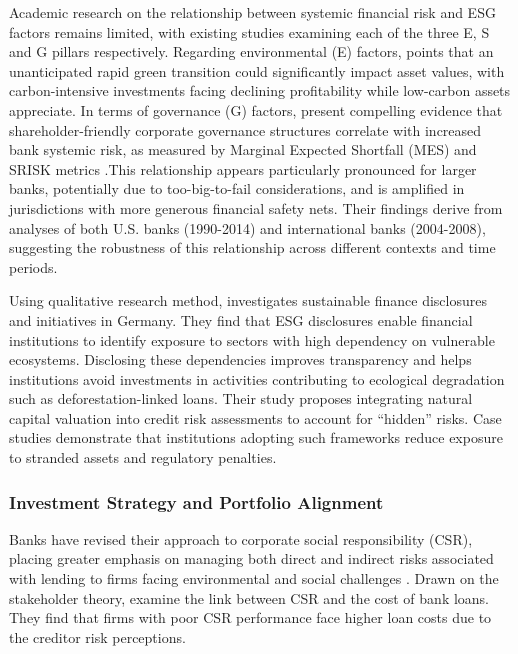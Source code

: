 \documentclass[
  authoryear]{elsarticle}
\begin{document}
Academic research on the relationship between systemic financial risk
and ESG factors remains limited, with existing studies examining each of
the three E, S and G pillars respectively. Regarding environmental (E)
factors, \citet{ESRB2016} points that an unanticipated rapid green
transition could significantly impact asset values, with
carbon-intensive investments facing declining profitability while
low-carbon assets appreciate. In terms of governance (G) factors,
\citet{ANGINER2018} present compelling evidence that
shareholder-friendly corporate governance structures correlate with
increased bank systemic risk, as measured by Marginal Expected Shortfall
(MES)\citep{ACHARYA2017} and SRISK metrics \citep{BROWNLEES2017}.This
relationship appears particularly pronounced for larger banks,
potentially due to too-big-to-fail considerations, and is amplified in
jurisdictions with more generous financial safety nets. Their findings
derive from analyses of both U.S. banks (1990-2014) and international
banks (2004-2008), suggesting the robustness of this relationship across
different contexts and time periods.

Using qualitative research method, \citet{KUHN2022} investigates
sustainable finance disclosures and initiatives in Germany. They find
that ESG disclosures enable financial institutions to identify exposure
to sectors with high dependency on vulnerable ecosystems. Disclosing
these dependencies improves transparency and helps institutions avoid
investments in activities contributing to ecological degradation such as
deforestation-linked loans. Their study proposes integrating natural
capital valuation into credit risk assessments to account for ``hidden''
risks. Case studies demonstrate that institutions adopting such
frameworks reduce exposure to stranded assets and regulatory penalties.

\subsubsection{Investment Strategy and Portfolio
Alignment}\label{investment-strategy-and-portfolio-alignment}

Banks have revised their approach to corporate social responsibility
(CSR), placing greater emphasis on managing both direct and indirect
risks associated with lending to firms facing environmental and social
challenges \citep{CARNEVALE2012}. Drawn on the stakeholder theory,
\citet{GOSS2011} examine the link between CSR and the cost of bank
loans. They find that firms with poor CSR performance face higher loan
costs due to the creditor risk perceptions.
\end{document}
